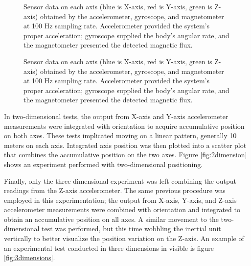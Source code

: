 \begin{figure}
    \centering
    \resizebox{1\linewidth}{!}{}
    \caption{Sensor data on each axis (blue is X-axis, red is Y-axis, green is Z-axis) obtained by the accelerometer, gyroscope, and magnetometer at 100 Hz sampling rate. Accelerometer provided the system's proper acceleration; gyroscope supplied the body's angular rate, and the magnetometer presented the detected magnetic flux.}
    \label{fig:square}
\end{figure}

\begin{figure}
    \centering
    \resizebox{1\linewidth}{!}{}
    \caption{Sensor data on each axis (blue is X-axis, red is Y-axis, green is Z-axis) obtained by the accelerometer, gyroscope, and magnetometer at 100 Hz sampling rate. Accelerometer provided the system's proper acceleration; gyroscope supplied the body's angular rate, and the magnetometer presented the detected magnetic flux.}
    \label{fig:square}
\end{figure}


In two-dimensional tests, the output from X-axis and Y-axis accelerometer measurements were integrated with orientation to acquire accumulative position on both axes. These tests implicated moving on a linear pattern, generally 10 meters on each axis. Integrated axis position was then plotted into a scatter plot that combines the accumulative position on the two axes. Figure \ref{fig:2dimension} shows an experiment performed with two-dimensional positioning.

Finally, only the three-dimensional experiment was left combining the output readings from the Z-axis accelerometer. The same previous procedure was employed in this experimentation; the output from X-axis, Y-axis, and Z-axis accelerometer measurements were combined with orientation and integrated to obtain an accumulative position on all axes. A similar movement to the two-dimensional test was performed, but this time wobbling the inertial unit vertically to better visualize the position variation on the Z-axis. An example of an experimental test conducted in three dimensions in visible is figure \ref{fig:3dimensions}.

